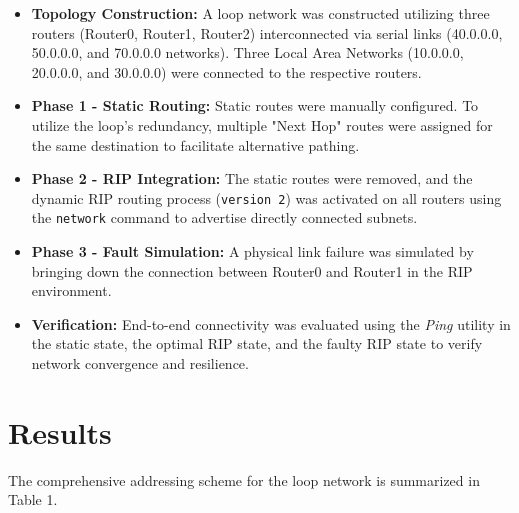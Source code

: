 \documentclass[11pt]{article}
\begin{document}
\begin{itemize}
    \item \textbf{Topology Construction:} A loop network was constructed utilizing three routers (Router0, Router1, Router2) interconnected via serial links (40.0.0.0, 50.0.0.0, and 70.0.0.0 networks). Three Local Area Networks (10.0.0.0, 20.0.0.0, and 30.0.0.0) were connected to the respective routers.
    \item \textbf{Phase 1 - Static Routing:} Static routes were manually configured. To utilize the loop's redundancy, multiple "Next Hop" routes were assigned for the same destination to facilitate alternative pathing.
    \item \textbf{Phase 2 - RIP Integration:} The static routes were removed, and the dynamic RIP routing process (\texttt{version 2}) was activated on all routers using the \texttt{network} command to advertise directly connected subnets.
    \item \textbf{Phase 3 - Fault Simulation:} A physical link failure was simulated by bringing down the connection between Router0 and Router1 in the RIP environment.
    \item \textbf{Verification:} End-to-end connectivity was evaluated using the \textit{Ping} utility in the static state, the optimal RIP state, and the faulty RIP state to verify network convergence and resilience.
\end{itemize}

\section{Results}
The comprehensive addressing scheme for the loop network is summarized in Table 1.
\end{document}

